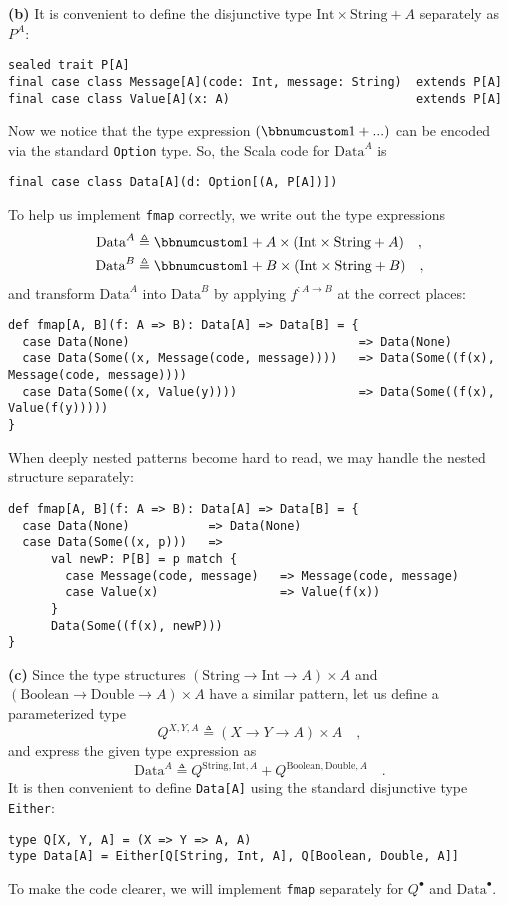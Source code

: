 \textbf{(b)} It is convenient to define the disjunctive type $\text{Int}\times\text{String}+A$
separately as $P^{A}$:
\begin{lstlisting}
sealed trait P[A]
final case class Message[A](code: Int, message: String)  extends P[A]
final case class Value[A](x: A)                          extends P[A]
\end{lstlisting}
Now we notice that the type expression $\left(\bbnum 1+...\right)$
can be encoded via the standard \lstinline!Option! type. So, the
Scala code for $\text{Data}^{A}$ is
\begin{lstlisting}
final case class Data[A](d: Option[(A, P[A])])
\end{lstlisting}
To help us implement \lstinline!fmap! correctly, we write out the
type expressions 
\begin{align*}
\text{Data}^{A} & \triangleq\bbnum 1+A\times(\text{Int}\times\text{String}+A)\quad,\\
\text{Data}^{B} & \triangleq\bbnum 1+B\times(\text{Int}\times\text{String}+B)\quad,
\end{align*}
and transform $\text{Data}^{A}$ into $\text{Data}^{B}$ by applying
$f^{:A\rightarrow B}$ at the correct places:
\begin{lstlisting}
def fmap[A, B](f: A => B): Data[A] => Data[B] = {
  case Data(None)                                => Data(None)
  case Data(Some((x, Message(code, message))))   => Data(Some((f(x), Message(code, message))))
  case Data(Some((x, Value(y))))                 => Data(Some((f(x), Value(f(y)))))
}
\end{lstlisting}
When deeply nested patterns become hard to read, we may handle the
nested structure separately:
\begin{lstlisting}
def fmap[A, B](f: A => B): Data[A] => Data[B] = {
  case Data(None)           => Data(None)
  case Data(Some((x, p)))   =>
      val newP: P[B] = p match {
        case Message(code, message)   => Message(code, message)
        case Value(x)                 => Value(f(x))
      }
      Data(Some((f(x), newP)))
}
\end{lstlisting}

\textbf{(c)} Since the type structures $(\text{String}\rightarrow\text{Int}\rightarrow A)\times A$
and $(\text{Boolean}\rightarrow\text{Double}\rightarrow A)\times A$
have a similar pattern, let us define a parameterized type
\[
Q^{X,Y,A}\triangleq\left(X\rightarrow Y\rightarrow A\right)\times A\quad,
\]
and express the given type expression as 
\[
\text{Data}^{A}\triangleq Q^{\text{String},\text{Int},A}+Q^{\text{Boolean},\text{Double},A}\quad.
\]
It is then convenient to define \lstinline!Data[A]! using the standard
disjunctive type \lstinline!Either!: 
\begin{lstlisting}
type Q[X, Y, A] = (X => Y => A, A)
type Data[A] = Either[Q[String, Int, A], Q[Boolean, Double, A]]
\end{lstlisting}
To make the code clearer, we will implement \lstinline!fmap! separately
for $Q^{\bullet}$ and $\text{Data}^{\bullet}$.

